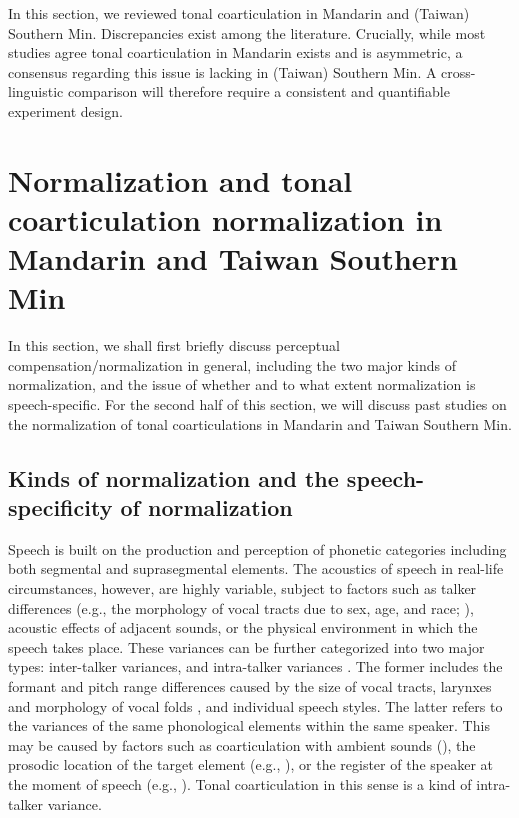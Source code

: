 In this section, we reviewed tonal coarticulation in Mandarin and (Taiwan) Southern Min. Discrepancies exist among the literature. Crucially, while most studies agree tonal coarticulation in Mandarin exists and is asymmetric, a consensus regarding this issue is lacking in (Taiwan) Southern Min. A cross-linguistic comparison will therefore require a consistent and quantifiable experiment design.

\section{Normalization and tonal coarticulation normalization in Mandarin and Taiwan Southern Min}

In this section, we shall first briefly discuss perceptual compensation/normalization in general, including the two major kinds of normalization, and the issue of whether and to what extent normalization is speech-specific. For the second half of this section, we will discuss past studies on the normalization of tonal coarticulations in Mandarin and Taiwan Southern Min.

\subsection{Kinds of normalization and the speech-specificity of normalization}\label{section:Kinds of normalization and the speech-specificity of normalization}

Speech is built on the production and perception of phonetic categories including both segmental and suprasegmental elements. The acoustics of speech in real-life circumstances, however, are highly variable, subject to factors such as talker differences (e.g., the morphology of vocal tracts due to sex, age, and race; \citealp{Markovaetal2016}), acoustic effects of adjacent sounds, or the physical environment in which the speech takes place. These variances can be further categorized into two major types: inter-talker variances, and intra-talker variances \citep{Francisetal2003}. The former includes the formant and pitch range differences caused by the size of vocal tracts, larynxes and morphology of vocal folds \citep{JohnsonSjerps2018}, and individual speech styles. The latter refers to the variances of the same phonological elements within the same speaker. This may be caused by factors such as coarticulation with ambient sounds (\citealp{WangFillmore1961}), the prosodic location of the target element (e.g., \citealp{Peng1997}), or the register of the speaker at the moment of speech (e.g., \citealp{Schaferetal2000}). Tonal coarticulation in this sense is a kind of intra-talker variance.

